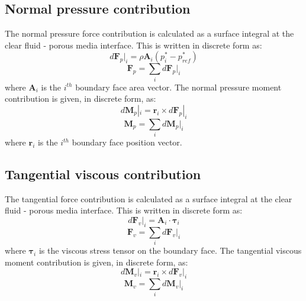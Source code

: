 \documentclass[a4paper,11pt]{report}
\begin{document}
\subsection{Normal pressure contribution}
The normal pressure force contribution is calculated as a surface integral at the clear fluid - porous media interface. This is written in discrete form as:
\begin{equation}
    d\mathbf{F}_p|_i = \rho\mathbf{A}_i(p_i^*-p_{ref}^*)
    \label{eq:dFpi}
\end{equation}
\begin{equation}
    \mathbf{F}_p = \sum_i d\mathbf{F}_p|_i
    \label{eq:Fp}
\end{equation}
where $\mathbf{A}_i$ is the $i^{th}$ boundary face area vector. The normal pressure moment contribution is given, in discrete form, as:
\begin{equation}
    d\mathbf{M}_p|_i = \mathbf{r}_i\times d\mathbf{F}_p|_i
    \label{eq:dMpi}
\end{equation}
\begin{equation}
    \mathbf{M}_p = \sum_i d\mathbf{M}_p|_i
    \label{eq:Mp}
\end{equation}
where $\mathbf{r}_i$ is the $i^{th}$ boundary face position vector.
\subsection{Tangential viscous contribution}
The tangential force contribution is calculated as a surface integral at the clear fluid - porous media interface. This is written in discrete form as:
\begin{equation}
    d\mathbf{F}_v|_i = \mathbf{A}_i\cdot \pmb{\tau}_i
    \label{eq:dFvi}
\end{equation}
\begin{equation}
    \mathbf{F}_v = \sum_i d\mathbf{F}_v|_i
    \label{eq:Fv}
\end{equation}
where $\pmb{\tau}_i$ is the viscous stress tensor on the boundary face. The tangential viscous moment contribution is given, in discrete form, as:
\begin{equation}
    d\mathbf{M}_v|_i = \mathbf{r}_i\times d\mathbf{F}_v|_i
    \label{eq:dMvi}
\end{equation}
\begin{equation}
    \mathbf{M}_v = \sum_i d\mathbf{M}_v|_i
    \label{eq:Mv}
\end{equation}
\end{document}

